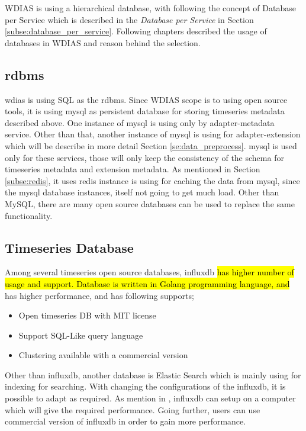 
WDIAS is using a hierarchical database, with following the concept of Database per Service which is described in the \emph{Database per Service} in Section \ref{subse:database_per_service}.
Following chapters described the usage of databases in WDIAS and reason behind the selection.

\subsection{\acrshort{rdbms}}
\label{subse:mysql}

\acrshort{wdias} is using SQL as the \acrfull{rdbms}. 
Since WDIAS scope is to using open source tools, it is using \acrshort{mysql} as persistent database for storing timeseries metadata described above.
One instance of \acrshort{mysql} is using only by adapter-metadata service.
Other than that, another instance of \acrshort{mysql} is using for adapter-extension which will be describe in more detail Section \ref{se:data_preprocess}.
\acrshort{mysql} is used only for these services, those will only keep the consistency of the schema for timeseries metadata and extension metadata.
As mentioned in Section \ref{subse:redis}, it uses \acrshort{redis} instance is using for caching the data from \acrshort{mysql}, since the \acrshort{mysql} database instances, itself not going to get much load.
Other than MySQL, there are many open source databases can be used to replace the same functionality.
\subsection{Timeseries Database}
\label{subse:influxdb}
Among several timeseries open source databases, \acrshort{influxdb} \cite{influxdbInfluxDBDocumentation} \hl{has higher number of usage and support. Database is written in Golang programming language, and} has higher performance, and has following supports;
\begin{itemize}
  \item Open timeseries DB with MIT license
  \item Support SQL-Like query language
  \item Clustering available with a commercial version
\end{itemize}
Other than \acrshort{influxdb}, another database is Elastic Search which is mainly using for indexing for searching.
With changing the configurations of the \acrshort{influxdb}, it is possible to adapt as required. As mention in \cite{influxdbInfluxDBDocumentation}, 
\acrshort{influxdb} can setup on a computer which will give the required performance. Going further, users can use commercial version of \acrshort{influxdb} in order to gain more performance.

